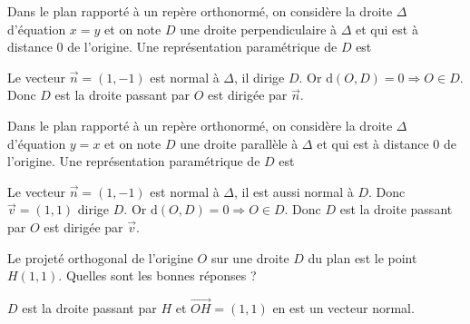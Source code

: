 \begin{question}

Dans le plan rapporté à un repère orthonormé, on considère la droite $\Delta$ d'équation $x=y$ et on note $D$ une droite perpendiculaire à $\Delta$ et qui est à distance $0$ de l'origine. Une représentation paramétrique de $D$ est
\begin{answers}  
\end{answers}
\begin{explanations}
Le vecteur $\vec{n}=(1,-1)$ est normal à $\Delta$, il dirige $D$. Or $\mbox{d}(O,D)=0\Rightarrow O\in D$. Donc $D$ est la droite passant par $O$ est dirigée par $\vec{n}$.
\end{explanations}
\end{question}


\begin{question}

Dans le plan rapporté à un repère orthonormé, on considère la droite $\Delta$ d'équation $y=x$ et on note $D$ une droite parallèle à $\Delta$ et qui est à distance $0$ de l'origine. Une représentation paramétrique de $D$ est
\begin{answers}  
\end{answers}
\begin{explanations}
Le vecteur $\vec{n}=(1,-1)$ est normal à $\Delta$, il est aussi normal à $D$. Donc $\vec{v}=(1,1)$ dirige $D$. Or $\mbox{d}(O,D)=0\Rightarrow O\in D$. Donc $D$ est la droite passant par $O$ est dirigée par $\vec{v}$.
\end{explanations}
\end{question}



\begin{question}

Le projeté orthogonal de l'origine $O$ sur une droite $D$ du plan est le point $H(1,1)$. Quelles sont les bonnes réponses ?
\begin{answers}  
\end{answers}
\begin{explanations}
$D$ est la droite passant par $H$ et $\overrightarrow{OH}=(1,1)$ en est un vecteur normal.
\end{explanations}
\end{question}

